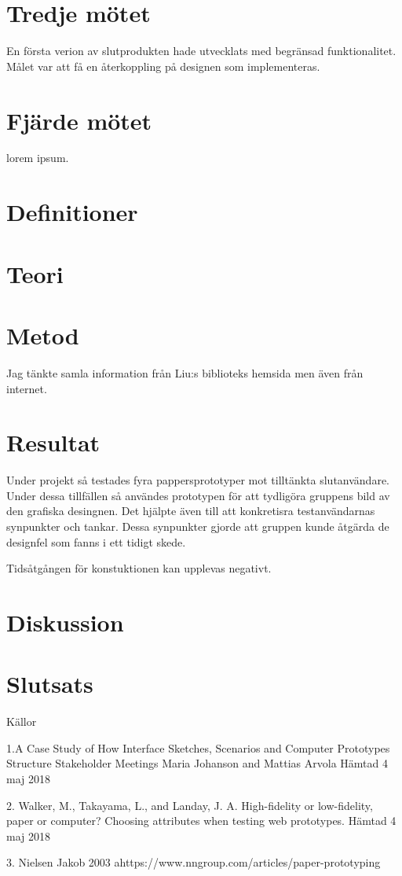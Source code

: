      
\section{Tredje mötet}
En första verion av slutprodukten hade utvecklats med begränsad funktionalitet. Målet var att få en återkoppling på designen som implementeras.   

\section{Fjärde mötet}
lorem ipsum.

\section{Definitioner}
  
\section{Teori}

\section{Metod}
Jag tänkte samla information från Liu:s biblioteks hemsida men även från internet. 

\section{Resultat}
Under projekt så testades fyra pappersprototyper mot tilltänkta slutanvändare. Under dessa tillfällen så användes prototypen för att tydligöra gruppens bild av den grafiska desingnen. Det hjälpte även till att konkretisra testanvändarnas synpunkter och tankar. Dessa synpunkter gjorde att gruppen kunde åtgärda de designfel som fanns i ett tidigt skede. 

Tidsåtgången för konstuktionen kan upplevas negativt.   

\section{Diskussion}

\section{Slutsats}

Källor

1.A Case Study of How Interface Sketches, Scenarios and Computer Prototypes Structure Stakeholder Meetings Maria Johanson and Mattias Arvola Hämtad 4 maj 2018  

2. Walker, M., Takayama, L., and Landay, J. A. High-fidelity or low-fidelity, paper or computer? Choosing attributes when testing web prototypes. Hämtad 4 maj 2018  

3. Nielsen Jakob 2003 
ahttps://www.nngroup.com/articles/paper-prototyping 